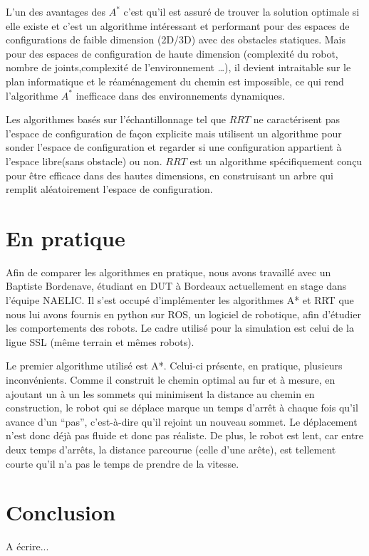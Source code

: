 \documentclass{article}
\begin{document}
L'un des avantages des $A^*$ c'est qu'il est assuré de trouver la solution optimale si elle existe et c'est un algorithme intéressant et performant pour des espaces de configurations de faible dimension (2D/3D) avec des obstacles statiques. Mais pour des espaces de configuration de haute dimension (complexité du robot, nombre de joints,complexité de l'environnement \ldots), il devient intraitable sur le plan informatique et le réaménagement du chemin est impossible, ce qui rend l'algorithme $A^*$ inefficace dans des environnements dynamiques. 

Les algorithmes basés sur l'échantillonnage tel que $RRT$ ne caractérisent pas l'espace de configuration de façon explicite mais utilisent un algorithme pour sonder l'espace de configuration et regarder si une configuration appartient à l'espace libre(sans obstacle)  ou non. $RRT$ est un algorithme spécifiquement conçu pour être efficace dans des hautes dimensions, en construisant un arbre qui remplit aléatoirement l'espace de configuration.

\section{En pratique}
Afin de comparer les algorithmes en pratique, nous avons travaillé avec un Baptiste Bordenave, étudiant en DUT à Bordeaux actuellement en stage dans l’équipe NAELIC. Il s’est occupé d’implémenter les algorithmes A* et RRT que nous lui avons fournis en python sur ROS, un logiciel de robotique, afin d’étudier les comportements des robots. Le cadre utilisé pour la simulation est celui de la ligue SSL (même terrain et mêmes robots).

Le premier algorithme utilisé est A*. Celui-ci présente, en pratique, plusieurs inconvénients. Comme il construit le chemin optimal au fur et à mesure, en ajoutant un à un les sommets qui minimisent la distance au chemin en construction, le robot qui se déplace marque un temps d’arrêt à chaque fois qu’il avance d’un “pas”, c’est-à-dire qu’il rejoint un nouveau sommet. Le déplacement n’est donc déjà pas fluide et donc pas réaliste. De plus, le robot est lent, car entre deux temps d’arrêts, la distance parcourue (celle d’une arête), est tellement courte qu’il n’a pas le temps de prendre de la vitesse.

\section{Conclusion}
A écrire...

\tableofcontents



\end{document}
